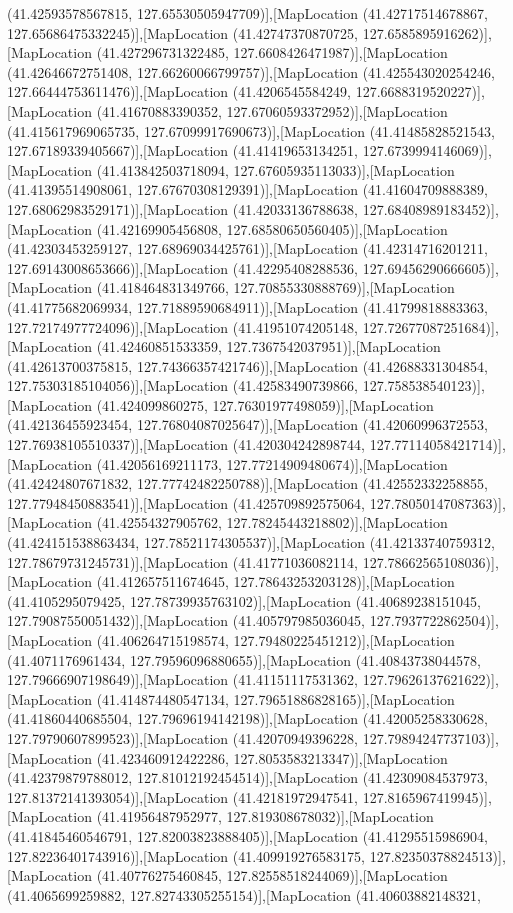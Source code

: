 (41.42593578567815, 127.65530505947709)],[MapLocation (41.42717514678867, 127.65686475332245)],[MapLocation (41.42747370870725, 127.6585895916262)],[MapLocation (41.427296731322485, 127.6608426471987)],[MapLocation (41.42646672751408, 127.66260066799757)],[MapLocation (41.425543020254246, 127.66444753611476)],[MapLocation (41.4206545584249, 127.6688319520227)],[MapLocation (41.41670883390352, 127.67060593372952)],[MapLocation (41.415617969065735, 127.67099917690673)],[MapLocation (41.41485828521543, 127.67189339405667)],[MapLocation (41.41419653134251, 127.6739994146069)],[MapLocation (41.413842503718094, 127.67605935113033)],[MapLocation (41.41395514908061, 127.67670308129391)],[MapLocation (41.41604709888389, 127.68062983529171)],[MapLocation (41.42033136788638, 127.68408989183452)],[MapLocation (41.42169905456808, 127.68580650560405)],[MapLocation (41.42303453259127, 127.68969034425761)],[MapLocation (41.42314716201211, 127.69143008653666)],[MapLocation (41.42295408288536, 127.69456290666605)],[MapLocation (41.418464831349766, 127.70855330888769)],[MapLocation (41.41775682069934, 127.71889590684911)],[MapLocation (41.41799818883363, 127.72174977724096)],[MapLocation (41.41951074205148, 127.72677087251684)],[MapLocation (41.42460851533359, 127.7367542037951)],[MapLocation (41.42613700375815, 127.74366357421746)],[MapLocation (41.42688331304854, 127.75303185104056)],[MapLocation (41.42583490739866, 127.758538540123)],[MapLocation (41.424099860275, 127.76301977498059)],[MapLocation (41.42136455923454, 127.76804087025647)],[MapLocation (41.42060996372553, 127.76938105510337)],[MapLocation (41.420304242898744, 127.77114058421714)],[MapLocation (41.42056169211173, 127.77214909480674)],[MapLocation (41.42424807671832, 127.77742482250788)],[MapLocation (41.42552332258855, 127.77948450883541)],[MapLocation (41.425709892575064, 127.78050147087363)],[MapLocation (41.42554327905762, 127.78245443218802)],[MapLocation (41.424151538863434, 127.78521174305537)],[MapLocation (41.42133740759312, 127.78679731245731)],[MapLocation (41.41771036082114, 127.78662565108036)],[MapLocation (41.412657511674645, 127.78643253203128)],[MapLocation (41.4105295079425, 127.78739935763102)],[MapLocation (41.40689238151045, 127.79087550051432)],[MapLocation (41.405797985036045, 127.7937722862504)],[MapLocation (41.406264715198574, 127.79480225451212)],[MapLocation (41.4071176961434, 127.79596096880655)],[MapLocation (41.40843738044578, 127.79666907198649)],[MapLocation (41.41151117531362, 127.79626137621622)],[MapLocation (41.414874480547134, 127.79651886828165)],[MapLocation (41.41860440685504, 127.79696194142198)],[MapLocation (41.42005258330628, 127.79790607899523)],[MapLocation (41.42070949396228, 127.79894247737103)],[MapLocation (41.423460912422286, 127.8053583213347)],[MapLocation (41.42379879788012, 127.81012192454514)],[MapLocation (41.42309084537973, 127.81372141393054)],[MapLocation (41.42181972947541, 127.8165967419945)],[MapLocation (41.41956487952977, 127.819308678032)],[MapLocation (41.41845460546791, 127.82003823888405)],[MapLocation (41.41295515986904, 127.82236401743916)],[MapLocation (41.409919276583175, 127.82350378824513)],[MapLocation (41.40776275460845, 127.82558518244069)],[MapLocation (41.4065699259882, 127.82743305255154)],[MapLocation (41.40603882148321, 